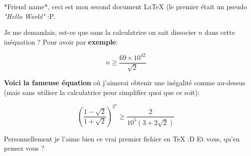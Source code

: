 \documentclass{article}
\begin{document}
*Friend name*, ceci est mon second document LaTeX (le premier était un pseudo \textit{"Hello World"} :P.

Je me demandais, est-ce que sans la calculatrice on sait dissocier $n$ dans cette inéquation ? Pour avoir par \textbf{exemple}:

\begin{equation}n \ge \frac{ 69 \times 10 ^ 42 }{ \sqrt{2} }\end{equation}

\textbf{Voici la fameuse équation} où j'aimerai obtenir une inégalité comme au-dessus (mais sans utiliser la calculatrice pour simplifier quoi que ce soit):

\begin{equation}\left( \frac{ 1 - \sqrt{2} }{ 1 + \sqrt{2} } \right) ^ {2 ^ n} \ge \frac{2}{10 ^ 5(3 + 2 \sqrt{2})}\end{equation}

Personnellement je l'aime bien ce vrai premier fichier en TeX :D Et vous, qu'en pensez vous ?
\end{document}
